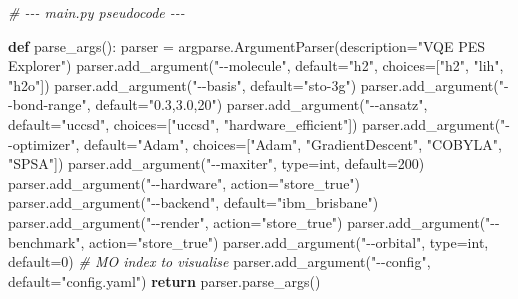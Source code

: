 \documentclass[
  11pt,
]{report}
\newenvironment{Shaded}{}{}
\newcommand{\BuiltInTok}[1]{\textcolor[rgb]{0.00,0.50,0.00}{#1}}
\newcommand{\CommentTok}[1]{\textcolor[rgb]{0.38,0.63,0.69}{\textit{#1}}}
\newcommand{\ControlFlowTok}[1]{\textcolor[rgb]{0.00,0.44,0.13}{\textbf{#1}}}
\newcommand{\DecValTok}[1]{\textcolor[rgb]{0.25,0.63,0.44}{#1}}
\newcommand{\KeywordTok}[1]{\textcolor[rgb]{0.00,0.44,0.13}{\textbf{#1}}}
\newcommand{\NormalTok}[1]{#1}
\newcommand{\OperatorTok}[1]{\textcolor[rgb]{0.40,0.40,0.40}{#1}}
\newcommand{\StringTok}[1]{\textcolor[rgb]{0.25,0.44,0.63}{#1}}
\begin{document}
\begin{Shaded}
\begin{Highlighting}[]
\CommentTok{\# {-}{-}{-} main.py pseudocode {-}{-}{-}}

\KeywordTok{def}\NormalTok{ parse\_args():}
\NormalTok{    parser }\OperatorTok{=}\NormalTok{ argparse.ArgumentParser(description}\OperatorTok{=}\StringTok{"VQE PES Explorer"}\NormalTok{)}
\NormalTok{    parser.add\_argument(}\StringTok{"{-}{-}molecule"}\NormalTok{, default}\OperatorTok{=}\StringTok{"h2"}\NormalTok{, choices}\OperatorTok{=}\NormalTok{[}\StringTok{"h2"}\NormalTok{, }\StringTok{"lih"}\NormalTok{, }\StringTok{"h2o"}\NormalTok{])}
\NormalTok{    parser.add\_argument(}\StringTok{"{-}{-}basis"}\NormalTok{, default}\OperatorTok{=}\StringTok{"sto{-}3g"}\NormalTok{)}
\NormalTok{    parser.add\_argument(}\StringTok{"{-}{-}bond{-}range"}\NormalTok{, default}\OperatorTok{=}\StringTok{"0.3,3.0,20"}\NormalTok{)}
\NormalTok{    parser.add\_argument(}\StringTok{"{-}{-}ansatz"}\NormalTok{, default}\OperatorTok{=}\StringTok{"uccsd"}\NormalTok{, choices}\OperatorTok{=}\NormalTok{[}\StringTok{"uccsd"}\NormalTok{, }\StringTok{"hardware\_efficient"}\NormalTok{])}
\NormalTok{    parser.add\_argument(}\StringTok{"{-}{-}optimizer"}\NormalTok{, default}\OperatorTok{=}\StringTok{"Adam"}\NormalTok{,}
\NormalTok{                        choices}\OperatorTok{=}\NormalTok{[}\StringTok{"Adam"}\NormalTok{, }\StringTok{"GradientDescent"}\NormalTok{, }\StringTok{"COBYLA"}\NormalTok{, }\StringTok{"SPSA"}\NormalTok{])}
\NormalTok{    parser.add\_argument(}\StringTok{"{-}{-}maxiter"}\NormalTok{, }\BuiltInTok{type}\OperatorTok{=}\BuiltInTok{int}\NormalTok{, default}\OperatorTok{=}\DecValTok{200}\NormalTok{)}
\NormalTok{    parser.add\_argument(}\StringTok{"{-}{-}hardware"}\NormalTok{, action}\OperatorTok{=}\StringTok{"store\_true"}\NormalTok{)}
\NormalTok{    parser.add\_argument(}\StringTok{"{-}{-}backend"}\NormalTok{, default}\OperatorTok{=}\StringTok{"ibm\_brisbane"}\NormalTok{)}
\NormalTok{    parser.add\_argument(}\StringTok{"{-}{-}render"}\NormalTok{, action}\OperatorTok{=}\StringTok{"store\_true"}\NormalTok{)}
\NormalTok{    parser.add\_argument(}\StringTok{"{-}{-}benchmark"}\NormalTok{, action}\OperatorTok{=}\StringTok{"store\_true"}\NormalTok{)}
\NormalTok{    parser.add\_argument(}\StringTok{"{-}{-}orbital"}\NormalTok{, }\BuiltInTok{type}\OperatorTok{=}\BuiltInTok{int}\NormalTok{, default}\OperatorTok{=}\DecValTok{0}\NormalTok{)    }\CommentTok{\# MO index to visualise}
\NormalTok{    parser.add\_argument(}\StringTok{"{-}{-}config"}\NormalTok{, default}\OperatorTok{=}\StringTok{"config.yaml"}\NormalTok{)}
    \ControlFlowTok{return}\NormalTok{ parser.parse\_args()}



\end{Highlighting}
\end{Shaded}
\end{document}
